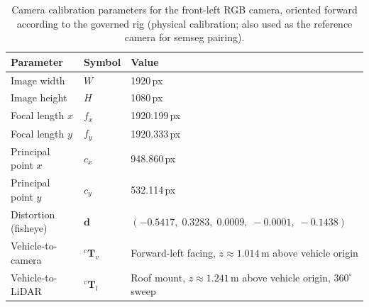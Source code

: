 \begin{table}[htbp]
  \centering
  \caption{Camera calibration parameters for the front-left RGB camera, oriented forward according to the governed rig (physical calibration; also used as the reference camera for semseg pairing).}
  \label{tab:camera_calib}
  \begin{tabular}{lll}
    \toprule
    Parameter & Symbol & Value \\
    \midrule
    Image width  & $W$       & 1920\,px \\
    Image height & $H$       & 1080\,px \\
    Focal length $x$ & $f_x$ & 1920.199\,px \\
    Focal length $y$ & $f_y$ & 1920.333\,px \\
    Principal point $x$ & $c_x$ & 948.860\,px \\
    Principal point $y$ & $c_y$ & 532.114\,px \\
    Distortion (fisheye) & $\mathbf{d}$ & $(-0.5417,\; 0.3283,\; 0.0009,\; -0.0001,\; -0.1438)$ \\
    Vehicle-to-camera & ${}^c\mathbf{T}_v$ & Forward-left facing, $z \approx 1.014$\,m above vehicle origin \\
    Vehicle-to-LiDAR & ${}^v\mathbf{T}_l$ & Roof mount, $z \approx 1.241$\,m above vehicle origin, $360^\circ$ sweep \\
    \bottomrule
  \end{tabular}
\end{table}
